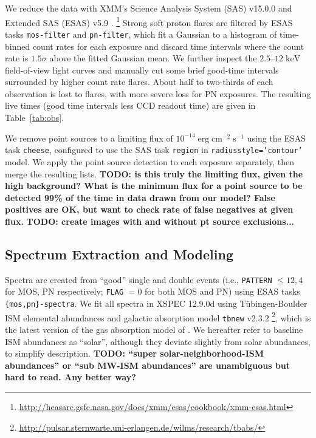 \documentclass[preprint2,tighten,trackchanges]{aastex6}
\newcommand*{\mt}{\mathrm}
\newcommand*{\unit}[1]{\;\mt{#1}}  %
\begin{document}
We reduce the data with XMM's Science Analysis System (SAS) v15.0.0 and
Extended SAS (ESAS) v5.9 \citep{snowden2008, kuntz2008}.
\footnote{\url{http://heasarc.gsfc.nasa.gov/docs/xmm/esas/cookbook/xmm-esas.html}}
Strong soft proton flares are filtered by ESAS tasks \texttt{mos-filter} and
\texttt{pn-filter}, which fit a Gaussian to a histogram of time-binned count
rates for each exposure and discard time intervals where the count rate is
$1.5\sigma$ above the fitted Gaussian mean.  %
We further inspect the $2.5$--$12 \unit{keV}$ field-of-view light curves and
manually cut some brief good-time intervals surrounded by higher count rate
flares.
About half to two-thirds of each observation is lost to flares, with more
severe loss for PN exposures.
The resulting live times (good time intervals less CCD readout time) are
given in Table~\ref{tab:obs}.

We remove point sources to a limiting flux of
$10^{-14} \unit{erg\;cm^{-2}\;s^{-1}}$ using the ESAS task \texttt{cheese},
configured to use the SAS task \texttt{region} in
\texttt{radiusstyle='contour'} model.
We apply the point source detection to each exposure separately, then merge the
resulting lists.
\textbf{TODO: is this truly the limiting flux, given the high background?
What is the minimum flux for a point source to be detected 99\% of the time in
data drawn from our model?
False positives are OK, but want to check rate of false negatives at given
flux.}
\textbf{TODO: create images with and without pt source exclusions...}

\begin{figure*}[!ht]
    \label{fig:regions}
\end{figure*}

\subsection{Spectrum Extraction and Modeling} \label{sec:spec-extract-fit}

Spectra are created from ``good'' single and double events (i.e.,
\texttt{PATTERN} $\leq 12,4$ for MOS, PN respectively; \texttt{FLAG} $= 0$ for
both MOS and PN) using ESAS tasks \texttt{\{mos,pn\}-spectra}.
We fit all spectra in XSPEC 12.9.0d \citep{arnaud1996}
using T{\"u}bingen-Boulder ISM elemental abundances \citep{wilms2000}
and galactic absorption model \texttt{tbnew} v2.3.2
\footnote{\url{http://pulsar.sternwarte.uni-erlangen.de/wilms/research/tbabs/}},
which is the latest version of the gas absorption model of \citet{wilms2000}.
We hereafter refer to baseline ISM abundances as ``solar'', although they
deviate slightly from solar abundances, to simplify description.
\textbf{TODO: ``super solar-neighborhood-ISM abundances'' or
``sub MW-ISM abundances'' are unambiguous but hard to read.  Any better way?}
\end{document}
